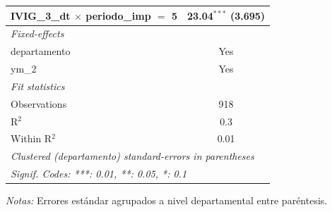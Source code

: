 \documentclass[12pt]{article}
\begin{document}
\begin{table}[htbp]
\begin{threeparttable}
\begin{tabular}{lc}
      IVIG\_3\_dt $\times$ periodo\_imp $=$ 5       & 23.04$^{***}$ (3.695)\\   
      \midrule
      \emph{Fixed-effects}\\
      departamento                                  & Yes\\  
      ym\_2                                         & Yes\\  
      \midrule
      \emph{Fit statistics}\\
      Observations                                  & 918\\  
      R$^2$                                         & 0.3\\  
      Within R$^2$                                  & 0.01\\  
      \midrule \midrule
      \multicolumn{2}{l}{\emph{Clustered (departamento) standard-errors in parentheses}}\\
      \multicolumn{2}{l}{\emph{Signif. Codes: ***: 0.01, **: 0.05, *: 0.1}}\\
   \end{tabular}


\begin{tablenotes}
\footnotesize
\item \textit{Notas:} Errores estándar agrupados a nivel departamental entre paréntesis.
\end{tablenotes}
\end{threeparttable}
\end{table}
\end{document}
